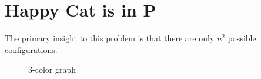 \section{ Happy Cat is in P}

The primary insight to this problem is that there are only $n^2$ possible configurations.

\begin{figure}[ht]
\centering
{}
\caption{3-color graph}
\label{fig:Union}
\end{figure}